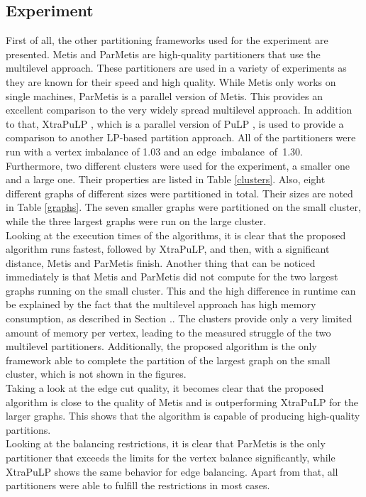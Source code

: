 \documentclass[acmsmall,nonacm,screen,review]{acmart}
\begin{document}
\subsection{Experiment}
First of all, the other partitioning frameworks used for the experiment are presented. Metis \cite{Metis} and ParMetis \cite{ParMetis} are high-quality partitioners that use the multilevel approach. These partitioners are used in a variety of experiments as they are known for their speed and high quality. While Metis only works on single machines, ParMetis is a parallel version of Metis. This provides an excellent comparison to the very widely spread multilevel approach. In addition to that, XtraPuLP \cite{XtraPuLP}, which is a parallel version of PuLP \cite{PuLP}, is used to provide a comparison to another LP-based partition approach. All of the partitioners were run with a vertex imbalance of 1.03 and an \hbox{edge imbalance of 1.30.} \\
Furthermore, two different clusters were used for the experiment, a smaller one and a large one. Their properties are listed in Table \ref{clusters}. Also, eight different graphs of different sizes were partitioned in total. Their sizes are noted in Table \ref{graphs}. The seven smaller graphs were partitioned on the small cluster, while the three largest graphs were run on the large cluster. \\
Looking at the execution times of the algorithms, it is clear that the proposed algorithm runs fastest, followed by XtraPuLP, and then, with a significant distance, Metis and ParMetis finish. Another thing that can be noticed immediately is that Metis and ParMetis did not compute for the two largest graphs running on the small cluster. This and the high difference in runtime can be explained by the fact that the multilevel approach has high memory consumption, as described in Section .. The clusters provide only a very limited amount of memory per vertex, leading to the measured struggle of the two multilevel partitioners. Additionally, the proposed algorithm is the only framework able to complete the partition of the largest graph on the small cluster, which is not shown in the figures. \\
Taking a look at the edge cut quality, it becomes clear that the proposed algorithm is close to the quality of Metis and is outperforming XtraPuLP for the larger graphs. This shows that the algorithm is capable of producing high-quality partitions. \\
Looking at the balancing restrictions, it is clear that ParMetis is the only partitioner that exceeds the limits for the vertex balance significantly, while XtraPuLP shows the same behavior for edge balancing. Apart from that, all partitioners were able to fulfill the restrictions in most cases. \\
\end{document}
